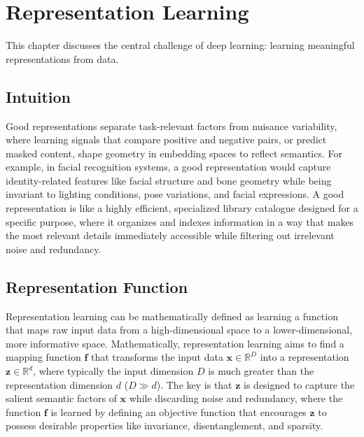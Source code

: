 
\chapter{Representation Learning}
\label{chap:representation-learning}

This chapter discusses the central challenge of deep learning: learning meaningful representations from data.


\begin{learningobjectives}
\end{learningobjectives}



\section*{Intuition}

Good representations separate task-relevant factors from nuisance variability, where learning signals that compare positive and negative pairs, or predict masked content, shape geometry in embedding spaces to reflect semantics. For example, in facial recognition systems, a good representation would capture identity-related features like facial structure and bone geometry while being invariant to lighting conditions, pose variations, and facial expressions. A good representation is like a highly efficient, specialized library catalogue designed for a specific purpose, where it organizes and indexes information in a way that makes the most relevant details immediately accessible while filtering out irrelevant noise and redundancy.

\section*{Representation Function}

Representation learning can be mathematically defined as learning a function that maps raw input data from a high-dimensional space to a lower-dimensional, more informative space. Mathematically, representation learning aims to find a mapping function $\mathbf{f}$ that transforms the input data $\mathbf{x} \in \mathbb{R}^{D}$ into a representation $\mathbf{z} \in \mathbb{R}^{d}$, where typically the input dimension $D$ is much greater than the representation dimension $d$ ($D \gg d$). The key is that $\mathbf{z}$ is designed to capture the salient semantic factors of $\mathbf{x}$ while discarding noise and redundancy, where the function $\mathbf{f}$ is learned by defining an objective function that encourages $\mathbf{z}$ to possess desirable properties like invariance, disentanglement, and sparsity.











